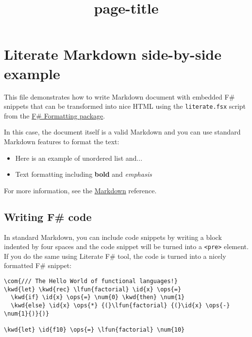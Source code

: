 \documentclass{article}
\title{{page-title}}
\date{}
\newcommand{\id}[1]{\textcolor{black}{#1}}
\newcommand{\com}[1]{\textcolor{officegreen}{#1}}
\newcommand{\kwd}[1]{\textcolor{navy}{#1}}
\newcommand{\num}[1]{\textcolor{officegreen}{#1}}
\newcommand{\ops}[1]{\textcolor{purple}{#1}}
\begin{document}
\maketitle

\section*{Literate Markdown side-by-side example}



This file demonstrates how to write Markdown document with
embedded F\# snippets that can be transformed into nice HTML
using the \texttt{literate.fsx} script from the \href{http://fsprojects.github.io/FSharp.Formatting}{F\# Formatting
package}.


In this case, the document itself is a valid Markdown and
you can use standard Markdown features to format the text:
\begin{itemize}
\item Here is an example of unordered list and...

\item Text formatting including \textbf{bold} and \emph{emphasis}

\end{itemize}



For more information, see the \href{http://daringfireball.net/projects/markdown}{Markdown} reference.
\subsection*{Writing F\# code}



In standard Markdown, you can include code snippets by
writing a block indented by four spaces and the code
snippet will be turned into a \texttt{<pre>} element. If you do
the same using Literate F\# tool, the code is turned into
a nicely formatted F\# snippet:
\begin{Verbatim}[commandchars=\\\{\}]
\com{/// The Hello World of functional languages!}
\kwd{let} \kwd{rec} \lfun{factorial} \id{x} \ops{=} 
  \kwd{if} \id{x} \ops{=} \num{0} \kwd{then} \num{1} 
  \kwd{else} \id{x} \ops{*} {(}\lfun{factorial} {(}\id{x} \ops{-} \num{1}{)}{)}

\kwd{let} \id{f10} \ops{=} \lfun{factorial} \num{10}

\end{Verbatim}
\end{document}
